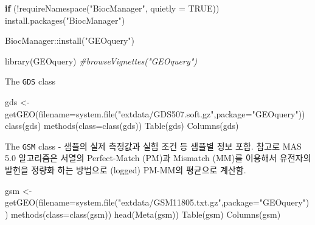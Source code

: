 \documentclass[
]{book}
\newenvironment{Shaded}{\begin{snugshade}}{\end{snugshade}}
\newcommand{\AttributeTok}[1]{\textcolor[rgb]{0.77,0.63,0.00}{#1}}
\newcommand{\CommentTok}[1]{\textcolor[rgb]{0.56,0.35,0.01}{\textit{#1}}}
\newcommand{\ConstantTok}[1]{\textcolor[rgb]{0.00,0.00,0.00}{#1}}
\newcommand{\ControlFlowTok}[1]{\textcolor[rgb]{0.13,0.29,0.53}{\textbf{#1}}}
\newcommand{\FunctionTok}[1]{\textcolor[rgb]{0.00,0.00,0.00}{#1}}
\newcommand{\NormalTok}[1]{#1}
\newcommand{\OtherTok}[1]{\textcolor[rgb]{0.56,0.35,0.01}{#1}}
\newcommand{\SpecialCharTok}[1]{\textcolor[rgb]{0.00,0.00,0.00}{#1}}
\newcommand{\StringTok}[1]{\textcolor[rgb]{0.31,0.60,0.02}{#1}}
\begin{document}
\begin{Shaded}
\begin{Highlighting}[]
\ControlFlowTok{if}\NormalTok{ (}\SpecialCharTok{!}\FunctionTok{requireNamespace}\NormalTok{(}\StringTok{"BiocManager"}\NormalTok{, }\AttributeTok{quietly =} \ConstantTok{TRUE}\NormalTok{))}
    \FunctionTok{install.packages}\NormalTok{(}\StringTok{"BiocManager"}\NormalTok{)}

\NormalTok{BiocManager}\SpecialCharTok{::}\FunctionTok{install}\NormalTok{(}\StringTok{"GEOquery"}\NormalTok{)}

\FunctionTok{library}\NormalTok{(GEOquery)}
\CommentTok{\#browseVignettes("GEOquery")}
\end{Highlighting}
\end{Shaded}

The \texttt{GDS} class

\begin{Shaded}
\begin{Highlighting}[]
\NormalTok{gds }\OtherTok{\textless{}{-}} \FunctionTok{getGEO}\NormalTok{(}\AttributeTok{filename=}\FunctionTok{system.file}\NormalTok{(}\StringTok{"extdata/GDS507.soft.gz"}\NormalTok{,}\AttributeTok{package=}\StringTok{"GEOquery"}\NormalTok{))}
\FunctionTok{class}\NormalTok{(gds)}
\FunctionTok{methods}\NormalTok{(}\AttributeTok{class=}\FunctionTok{class}\NormalTok{(gds))}
\FunctionTok{Table}\NormalTok{(gds)}
\FunctionTok{Columns}\NormalTok{(gds)}
\end{Highlighting}
\end{Shaded}

The \texttt{GSM} class - 샘플의 실제 측정값과 실험 조건 등 샘플별 정보 포함. 참고로 MAS 5.0 알고리즘은 서열의 Perfect-Match (PM)과 Mismatch (MM)를 이용해서 유전자의 발현을 정량화 하는 방법으로 (logged) PM-MM의 평균으로 계산함.

\begin{Shaded}
\begin{Highlighting}[]
\NormalTok{gsm }\OtherTok{\textless{}{-}} \FunctionTok{getGEO}\NormalTok{(}\AttributeTok{filename=}\FunctionTok{system.file}\NormalTok{(}\StringTok{"extdata/GSM11805.txt.gz"}\NormalTok{,}\AttributeTok{package=}\StringTok{"GEOquery"}\NormalTok{))}
\FunctionTok{methods}\NormalTok{(}\AttributeTok{class=}\FunctionTok{class}\NormalTok{(gsm))}
\FunctionTok{head}\NormalTok{(}\FunctionTok{Meta}\NormalTok{(gsm))}
\FunctionTok{Table}\NormalTok{(gsm)}
\FunctionTok{Columns}\NormalTok{(gsm)}
\end{Highlighting}
\end{Shaded}
\end{document}

